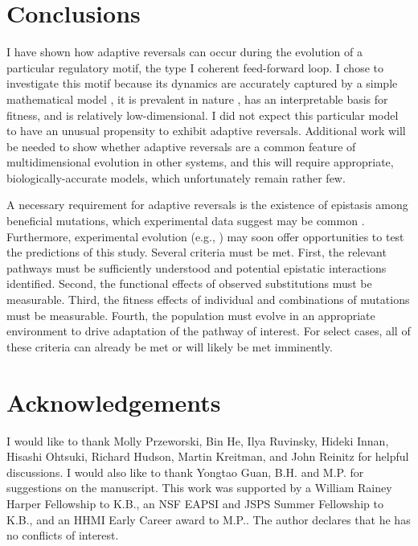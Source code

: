 \documentclass[dvips,12pt,twoside,titlepage]{article}
\begin{document}
\section*{Conclusions}

I have shown how adaptive reversals can occur during the evolution of a particular regulatory motif, the type I coherent feed-forward loop.
I chose to investigate this motif because its dynamics are accurately captured by a simple mathematical model \cite{Mangan:2003vl}, it is prevalent in nature \cite{ShenOrr:2002jo,Alon:2007ca}, has an interpretable basis for fitness, and is relatively low-dimensional. 
I did not expect this particular model to have an unusual propensity to exhibit adaptive reversals.
Additional work will be needed to show whether adaptive reversals are a common feature of multidimensional evolution in other systems, and this will require appropriate, biologically-accurate models, which unfortunately remain rather few.

A necessary requirement for adaptive reversals is the existence of epistasis among beneficial mutations, which experimental data suggest may be common \cite{Weinreich:2006ig,MacLean:2010dm}. Furthermore, experimental evolution (e.g., ) may soon offer opportunities to test the predictions of this study. Several criteria must be met. First, the relevant pathways must be sufficiently understood and potential epistatic interactions identified. Second, the functional effects of observed substitutions must be measurable. Third, the fitness effects of individual and combinations of mutations must be measurable. Fourth, the population must evolve in an appropriate environment to drive adaptation of the pathway of interest. For select cases, all of these criteria can already be met or will likely be met imminently.

\section*{Acknowledgements}

I would like to thank Molly Przeworski, Bin He, Ilya Ruvinsky, Hideki Innan, Hisashi Ohtsuki, Richard Hudson, Martin Kreitman, and John Reinitz for helpful discussions. I would also like to thank Yongtao Guan, B.H. and M.P. for suggestions on the manuscript. This work was supported by a William Rainey Harper Fellowship to K.B., an NSF EAPSI and JSPS Summer Fellowship to K.B., and an HHMI Early Career award to M.P..
The author declares that he has no conflicts of interest.
\end{document}
